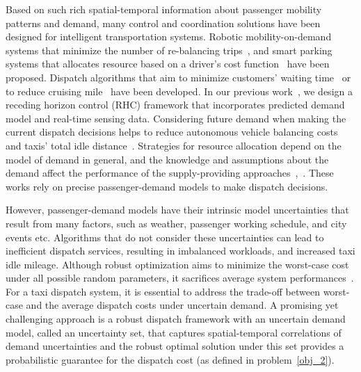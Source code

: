 \documentclass[10pt,twocolumn,twoside,english]{IEEEtran}
\begin{document}
Based on such rich spatial-temporal information about passenger mobility patterns and demand, many control and coordination solutions have been designed for intelligent transportation systems. Robotic mobility-on-demand systems that minimize the number of re-balancing trips~\cite{mod_balance, mod}, and smart parking systems that allocates resource based on a driver's cost function~\cite{smart_christos} have been proposed. Dispatch algorithms that aim to minimize customers' waiting time~\cite{congest_disp, Lee_review} or to reduce cruising mile~\cite{Desheng_mile} have been developed. In our previous work~\cite{Miao_tase16, taxi_Feiiccps15}, we design a receding horizon control (RHC) framework that incorporates predicted demand model and real-time sensing data. Considering future demand when making the current dispatch decisions helps to reduce autonomous vehicle balancing costs~\cite{mod} and taxis' total idle distance~\cite{taxi_Feiiccps15, Miao_tase16}. Strategies for resource allocation depend on the model of demand in general, and the knowledge and assumptions about the demand affect the performance of the supply-providing approaches~\cite{Arzen_dra},~\cite{Quijano_ra}. These works rely on precise passenger-demand models to make dispatch decisions. 

 
However, passenger-demand models have their intrinsic model uncertainties that result from many factors, such as weather, passenger working schedule, and city events etc. Algorithms that do not consider these uncertainties can lead to inefficient dispatch services, resulting in imbalanced workloads, and increased taxi idle mileage. Although robust optimization aims to minimize the worst-case cost under all possible random parameters, it sacrifices average system performances~\cite{robust_allocate}. For a taxi dispatch system, it is essential to address the trade-off between worst-case and the average dispatch costs under uncertain demand. A promising yet challenging approach is a robust dispatch framework with an uncertain demand model, called an uncertainty set, that captures spatial-temporal correlations of demand uncertainties and the robust optimal solution under this set provides a probabilistic guarantee for the dispatch cost (as defined in problem~\eqref{obj_2}). 
\end{document}

